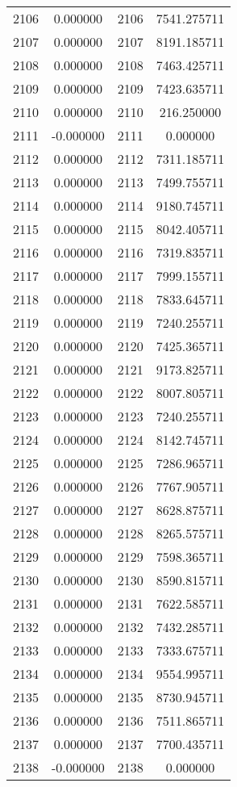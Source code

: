 \documentclass[12pt]{article}
\begin{document}
\begin{longtable}{@{}cccc@{}}
2106 & 0.000000 & 2106 & 7541.275711 \\
2107 & 0.000000 & 2107 & 8191.185711 \\
2108 & 0.000000 & 2108 & 7463.425711 \\
2109 & 0.000000 & 2109 & 7423.635711 \\
2110 & 0.000000 & 2110 & 216.250000 \\
2111 & -0.000000 & 2111 & 0.000000 \\
2112 & 0.000000 & 2112 & 7311.185711 \\
2113 & 0.000000 & 2113 & 7499.755711 \\
2114 & 0.000000 & 2114 & 9180.745711 \\
2115 & 0.000000 & 2115 & 8042.405711 \\
2116 & 0.000000 & 2116 & 7319.835711 \\
2117 & 0.000000 & 2117 & 7999.155711 \\
2118 & 0.000000 & 2118 & 7833.645711 \\
2119 & 0.000000 & 2119 & 7240.255711 \\
2120 & 0.000000 & 2120 & 7425.365711 \\
2121 & 0.000000 & 2121 & 9173.825711 \\
2122 & 0.000000 & 2122 & 8007.805711 \\
2123 & 0.000000 & 2123 & 7240.255711 \\
2124 & 0.000000 & 2124 & 8142.745711 \\
2125 & 0.000000 & 2125 & 7286.965711 \\
2126 & 0.000000 & 2126 & 7767.905711 \\
2127 & 0.000000 & 2127 & 8628.875711 \\
2128 & 0.000000 & 2128 & 8265.575711 \\
2129 & 0.000000 & 2129 & 7598.365711 \\
2130 & 0.000000 & 2130 & 8590.815711 \\
2131 & 0.000000 & 2131 & 7622.585711 \\
2132 & 0.000000 & 2132 & 7432.285711 \\
2133 & 0.000000 & 2133 & 7333.675711 \\
2134 & 0.000000 & 2134 & 9554.995711 \\
2135 & 0.000000 & 2135 & 8730.945711 \\
2136 & 0.000000 & 2136 & 7511.865711 \\
2137 & 0.000000 & 2137 & 7700.435711 \\
2138 & -0.000000 & 2138 & 0.000000 \\

\end{longtable}
\end{document}
